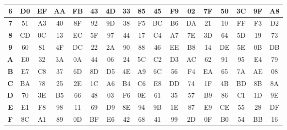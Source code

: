 \begin{table}[tbh]
\begin{tabular}{c|c|c|c|c|c|c|c|c|c|c|c|c|c|c|c|c|}
		\multicolumn{1}{|c|}{\textbf{6}} & D0         & EF         & AA         & FB         & 43         & 4D         & 33         & 85         & 45         & F9         & 02         & 7F         & 50         & 3C         & 9F         & A8         \\ \hline
		\multicolumn{1}{|c|}{\textbf{7}} & 51         & A3         & 40         & 8F         & 92         & 9D         & 38         & F5         & BC         & B6         & DA         & 21         & 10         & FF         & F3         & D2         \\ \hline
		\multicolumn{1}{|c|}{\textbf{8}} & CD         & 0C         & 13         & EC         & 5F         & 97         & 44         & 17         & C4         & A7         & 7E         & 3D         & 64         & 5D         & 19         & 73         \\ \hline
		\multicolumn{1}{|c|}{\textbf{9}} & 60         & 81         & 4F         & DC         & 22         & 2A         & 90         & 88         & 46         & EE         & B8         & 14         & DE         & 5E         & 0B         & DB         \\ \hline
		\multicolumn{1}{|c|}{\textbf{A}} & E0         & 32         & 3A         & 0A         & 44         & 06         & 24         & 5C         & C2         & D3         & AC         & 62         & 91         & 95         & E4         & 79         \\ \hline
		\multicolumn{1}{|c|}{\textbf{B}} & E7         & C8         & 37         & 6D         & 8D         & D5         & 4E         & A9         & 6C         & 56         & F4         & EA         & 65         & 7A         & AE         & 08         \\ \hline
		\multicolumn{1}{|c|}{\textbf{C}} & BA         & 78         & 25         & 2E         & 1C         & A6         & B4         & C6         & E8         & DD         & 74         & 1F         & 4B         & BD         & 8B         & 8A         \\ \hline
		\multicolumn{1}{|c|}{\textbf{D}} & 70         & 3E         & B5         & 66         & 48         & 03         & F6         & 0E         & 61         & 35         & 57         & B9         & 86         & C1         & 1D         & 9E         \\ \hline
		\multicolumn{1}{|c|}{\textbf{E}} & E1         & F8         & 98         & 11         & 69         & D9         & 8E         & 94         & 9B         & 1E         & 87         & E9         & CE         & 55         & 28         & DF         \\ \hline
		\multicolumn{1}{|c|}{\textbf{F}} & 8C         & A1         & 89         & 0D         & BF         & E6         & 42         & 68         & 41         & 99         & 2D         & 0F         & B0         & 54         & BB         & 16         \\ \hline
	\end{tabular}
\end{table}
